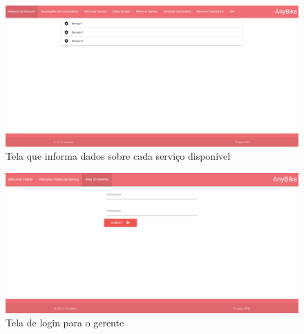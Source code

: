 \documentclass[
	12pt,				%
	openright,
	oneside,			%
	a4paper,			%
	chapter=TITLE,		%
	brazil				%
	]{abntex2}
\begin{document}
\begin{figure}[htb]
	\caption{Tela que informa dados sobre cada serviço disponível}
	\begin{center}
	    \includegraphics[scale=0.3]{Arquivos/relatorio_servico}  %
	\end{center}
\end{figure}


\begin{figure}[htb]
	\caption{Tela de login para o gerente}
	\begin{center}
	    \includegraphics[scale=0.3]{Arquivos/login}  
	\end{center}
\end{figure}


  
\end{document}
